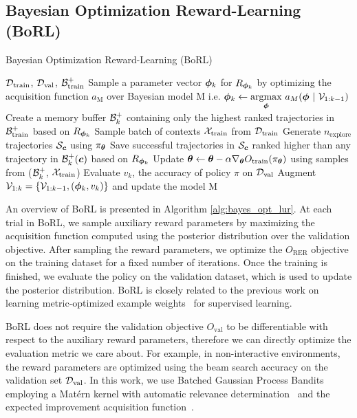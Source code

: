 \subsection{Bayesian Optimization Reward-Learning (BoRL)}
\begin{algorithm}[t]
   \caption{Bayesian Optimization Reward-Learning (BoRL)}
   \label{alg:bayes_opt_lur}
\begin{algorithmic}
   $\mathcal{D}_{\mathrm{train}}$, $\mathcal{D}_{\mathrm{val}}$, $\mathcal{B}^{+}_{\mathrm{train}}$
    \STATE Sample a parameter vector ${\bm{\phi}}_{k}$ for $R_{{\bm{\phi}}_{k}}$ by optimizing the acquisition function $a_{\mathrm{M}}$ over Bayesian model M i.e. ${\bm{\phi}}_{k} \leftarrow \underset{{\bm{\phi}}}{\operatorname{argmax}}\ a_{M}({\bm{\phi}} \ |\ \mathcal{V}_{1:k-1} )$
    \STATE Create a memory buffer $\mathcal{B}^+_{k}$ containing only the highest ranked trajectories in $\mathcal{B}^{+}_{\mathrm{train}}$ based on $R_{{\bm{\phi}}_{k}}$
      \STATE Sample batch of contexts $\mathcal{X}_{\mathrm{train}}$ from $\mathcal{D}_{\mathrm{train}}$
        \STATE Generate $n_{\mathrm{explore}}$ trajectories $\mathcal{S}_{{\bm{c}}}$ using $\pi_{{\bm{\theta}}}$
        \STATE Save successful trajectories in $\mathcal{S}_{{\bm{c}}}$ ranked higher than any trajectory in $\mathcal{B}^+_{k}({\bm{c}})$ based on $R_{{\bm{\phi}}_{k}}$
      \ENDFOR
      \STATE Update ${\bm{\theta}} \leftarrow {\bm{\theta}} - \alpha \nabla_{{\bm{\theta}}} O_{\mathrm{train}}(\pi_{{\bm{\theta}}})$ using samples from ($\mathcal{B}^+_{k}$, $\mathcal{X}_{\mathrm{train}}$)
    \ENDFOR
    \STATE Evaluate $v_{k}$, the accuracy of policy $\pi$ on $\mathcal{D}_{\mathrm{val}}$
    \STATE Augment $\mathcal{V}_{1:k} = \{\mathcal{V}_{1:k-1}, ({\bm{\phi}}_{k}, v_{k})\}$ and update the model M
  \ENDFOR
\end{algorithmic}
\end{algorithm}

An overview of BoRL is presented in Algorithm \ref{alg:bayes_opt_lur}. At each trial in BoRL, we sample auxiliary reward parameters by maximizing the acquisition function computed using the posterior distribution over the validation objective. After sampling the reward parameters, we optimize the $O_{\mathrm{RER}}$ objective on the training dataset for a fixed number of iterations. Once the training is finished, we evaluate the policy on the validation dataset, which is used to update the posterior distribution. BoRL is closely related to the previous work on learning metric-optimized example weights~\cite{zhao2018metric} for supervised learning.

BoRL does not require the validation objective $O_{\mathrm{val}}$ to be differentiable with respect to the auxiliary reward parameters, therefore we can directly optimize the evaluation metric we care about. For example, in non-interactive environments, the reward parameters are optimized using the beam search accuracy on the validation set $\displaystyle {\mathcal{D}}_{\mathrm{val}}$. In this work, we use Batched Gaussian Process Bandits~\cite{desautels2014parallelizing} employing a Mat\'ern kernel with automatic relevance determination~\cite{rasmussen2004gaussian} and the expected improvement acquisition function~\cite{movckus1975bayesian}.

